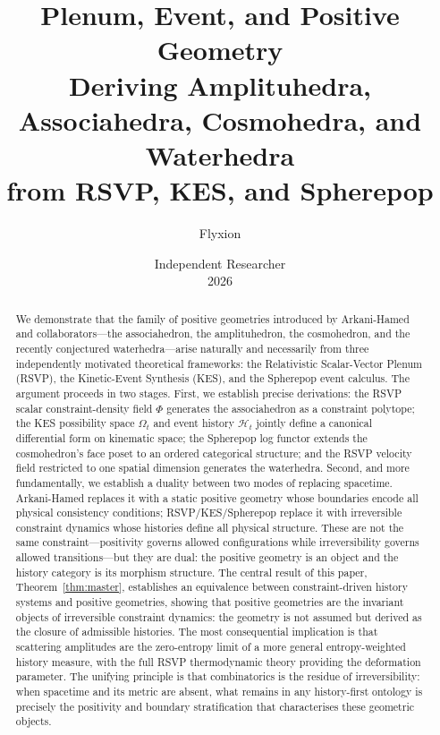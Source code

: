 \documentclass[12pt, oneside]{amsart}
\title{\textbf{Plenum, Event, and Positive Geometry}\\[0.6em]
\large Deriving Amplituhedra, Associahedra, Cosmohedra, and Waterhedra\\
from RSVP, KES, and Spherepop}
\author{Flyxion}
\date{Independent Researcher\\[0.3em] 2026}
\theoremstyle{plain}
\theoremstyle{definition}
\theoremstyle{remark}
\newcommand{\Phif}{\Phi}
\newcommand{\OmKS}{\Omega}
\newcommand{\HKS}{\mathcal{H}}
\begin{document}
\maketitle
\thispagestyle{empty}

\begin{abstract}
We demonstrate that the family of positive geometries introduced by Arkani-Hamed and collaborators---the associahedron, the amplituhedron, the cosmohedron, and the recently conjectured waterhedra---arise naturally and necessarily from three independently motivated theoretical frameworks: the Relativistic Scalar-Vector Plenum (RSVP), the Kinetic-Event Synthesis (KES), and the Spherepop event calculus. The argument proceeds in two stages. First, we establish precise derivations: the RSVP scalar constraint-density field $\Phif$ generates the associahedron as a constraint polytope; the KES possibility space $\OmKS_t$ and event history $\HKS_t$ jointly define a canonical differential form on kinematic space; the Spherepop log functor extends the cosmohedron's face poset to an ordered categorical structure; and the RSVP velocity field restricted to one spatial dimension generates the waterhedra. Second, and more fundamentally, we establish a duality between two modes of replacing spacetime. Arkani-Hamed replaces it with a static positive geometry whose boundaries encode all physical consistency conditions; RSVP/KES/Spherepop replace it with irreversible constraint dynamics whose histories define all physical structure. These are not the same constraint---positivity governs allowed configurations while irreversibility governs allowed transitions---but they are dual: the positive geometry is an object and the history category is its morphism structure. The central result of this paper, Theorem~\ref{thm:master}, establishes an equivalence between constraint-driven history systems and positive geometries, showing that positive geometries are the invariant objects of irreversible constraint dynamics: the geometry is not assumed but derived as the closure of admissible histories. The most consequential implication is that scattering amplitudes are the zero-entropy limit of a more general entropy-weighted history measure, with the full RSVP thermodynamic theory providing the deformation parameter. The unifying principle is that combinatorics is the residue of irreversibility: when spacetime and its metric are absent, what remains in any history-first ontology is precisely the positivity and boundary stratification that characterises these geometric objects.
\end{abstract}
\end{document}
